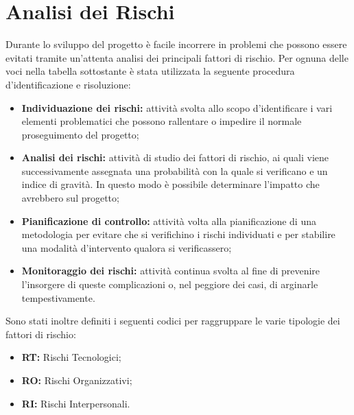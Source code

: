 \section{Analisi dei Rischi}
Durante lo sviluppo del progetto è facile incorrere in problemi che possono essere evitati tramite un'attenta analisi dei principali fattori di rischio.
Per ognuna delle voci nella tabella sottostante è stata utilizzata la seguente procedura d'identificazione e risoluzione:

\begin{itemize}
    \item \textbf{Individuazione dei rischi: }attività svolta allo scopo d'identificare i vari elementi problematici che possono rallentare o impedire il normale proseguimento del progetto;
    \item \textbf{Analisi dei rischi: }attività di studio dei fattori di rischio, ai quali viene successivamente assegnata una probabilità con la quale si verificano e un indice di gravità. In questo modo è possibile determinare l'impatto che avrebbero sul progetto;
    \item \textbf{Pianificazione di controllo: } attività volta alla pianificazione di una metodologia per evitare che si verifichino i rischi individuati e per stabilire una modalità d'intervento qualora si verificassero;
    \item \textbf{Monitoraggio dei rischi: }attività continua svolta al fine di prevenire l'insorgere di queste complicazioni o, nel peggiore dei casi, di arginarle tempestivamente.
\end{itemize}

Sono stati inoltre definiti i seguenti codici per raggruppare le varie tipologie dei fattori di rischio:
\begin{itemize}
    \item \textbf{RT: }Rischi Tecnologici;
    \item \textbf{RO: }Rischi Organizzativi;
    \item \textbf{RI: }Rischi Interpersonali.
\end{itemize}

